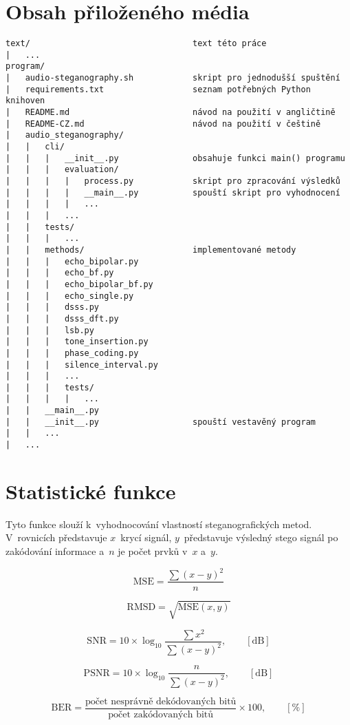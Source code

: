 \chapter{Obsah přiloženého média}
\label{cha:medium-contents}

\begin{verbatim}
text/                                 text této práce
|   ...
program/
|   audio-steganography.sh            skript pro jednodušší spuštění
|   requirements.txt                  seznam potřebných Python knihoven
|   README.md                         návod na použití v angličtině
|   README-CZ.md                      návod na použití v češtině
|   audio_steganography/
|   |   cli/
|   |   |   __init__.py               obsahuje funkci main() programu
|   |   |   evaluation/
|   |   |   |   process.py            skript pro zpracování výsledků
|   |   |   |   __main__.py           spouští skript pro vyhodnocení
|   |   |   |   ...
|   |   |   ...
|   |   tests/
|   |   |   ...
|   |   methods/                      implementované metody
|   |   |   echo_bipolar.py
|   |   |   echo_bf.py
|   |   |   echo_bipolar_bf.py
|   |   |   echo_single.py
|   |   |   dsss.py
|   |   |   dsss_dft.py
|   |   |   lsb.py
|   |   |   tone_insertion.py
|   |   |   phase_coding.py
|   |   |   silence_interval.py
|   |   |   ...
|   |   |   tests/
|   |   |   |   ...
|   |   __main__.py
|   |   __init__.py                   spouští vestavěný program
|   |   ...
|   ...
\end{verbatim}


\chapter{Statistické funkce}
\label{cha:statistical-functions}

Tyto funkce slouží k~vyhodnocování vlastností steganografických metod.
V~rovnicích představuje $x$~krycí signál, $y$~představuje výsledný stego
signál po zakódování informace a~$n$ je počet prvků v~$x$ a~$y$.

\begin{equation}
    \textrm{MSE} = \frac{\sum{(x-y)^2}}{n}
\end{equation}

\begin{equation}
    \textrm{RMSD} = \sqrt{\textrm{MSE}(x, y)}
\end{equation}

\begin{equation}
    \textrm{SNR} = 10 \times \log_{10}{\frac{\sum{x^2}}{\sum{(x-y)^2}}}, \qquad [\textrm{dB}]
\end{equation}

\begin{equation}
    \textrm{PSNR} = 10 \times \log_{10}{\frac{n}{\sum{(x-y)^2}}}, \qquad [\textrm{dB}]
\end{equation}

\begin{equation}
    \textrm{BER} = \frac{\textrm{počet nesprávně dekódovaných bitů}}{\textrm{počet zakódovaných bitů}} \times 100, \qquad [\%]
\end{equation}
